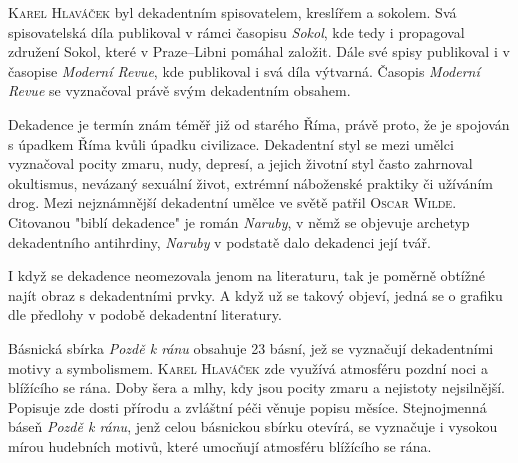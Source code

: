 \documentclass[11pt]{article}
\begin{document}
\setlength{\parindent}{2em}


\textsc{Karel Hlaváček} byl dekadentním spisovatelem, kreslířem a sokolem. Svá spisovatelská díla publikoval v rámci časopisu \textit{Sokol}, kde tedy i propagoval združení Sokol, které v Praze--Libni pomáhal založit. Dále své spisy publikoval i v časopise \textit{Moderní Revue}, kde publikoval i svá díla výtvarná. Časopis \textit{Moderní Revue} se vyznačoval právě svým dekadentním obsahem. \par
Dekadence je termín znám téměř již od starého Říma, právě proto, že je spojován s úpadkem Říma kvůli úpadku civilizace. Dekadentní styl se mezi umělci vyznačoval pocity zmaru, nudy, depresí, a jejich životní styl často zahrnoval okultismus, nevázaný sexuální život, extrémní náboženské praktiky či užíváním drog. Mezi nejznámnější dekadentní umělce ve světě patřil \textsc{Oscar Wilde}. Citovanou "biblí dekadence" je román \textit{Naruby}, v němž se objevuje archetyp dekadentního antihrdiny, \textit{Naruby} v podstatě dalo dekadenci její tvář. \par
I když se dekadence neomezovala jenom na literaturu, tak je poměrně obtížné najít obraz s dekadentními prvky. A když už se takový objeví, jedná se o grafiku dle předlohy v podobě dekadentní literatury. \par
Básnická sbírka \textit{Pozdě k ránu} obsahuje 23 básní, jež se vyznačují dekadentními motivy a symbolismem. \textsc{Karel Hlaváček} zde využívá atmosféru pozdní noci a blížícího se rána. Doby šera a mlhy, kdy jsou pocity zmaru a nejistoty nejsilnější. Popisuje zde dosti přírodu a zvláštní péči věnuje popisu měsíce. Stejnojmenná báseň \textit{Pozdě k ránu}, jenž celou básnickou sbírku otevírá, se vyznačuje i vysokou mírou hudebních motivů, které umocňují atmosféru blížícího se rána.
\end{document}
